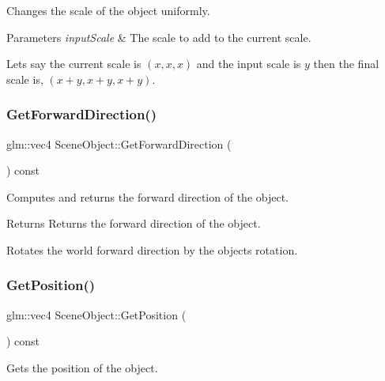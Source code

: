 Changes the scale of the object uniformly. 


\begin{DoxyParams}{Parameters}
{\em input\+Scale} & The scale to add to the current scale.\\
\hline
\end{DoxyParams}
Let\textquotesingle{}s say the current scale is $(x, x, x)$ and the input scale is $y$ then the final scale is, $(x + y, x + y, x + y)$. \hypertarget{class_scene_object_a17a33730106caaeeaede13682440eadc}{}\label{class_scene_object_a17a33730106caaeeaede13682440eadc} 
\subsubsection{\texorpdfstring{Get\+Forward\+Direction()}{GetForwardDirection()}}
{\footnotesize\ttfamily glm\+::vec4 Scene\+Object\+::\+Get\+Forward\+Direction (\begin{DoxyParamCaption}{ }\end{DoxyParamCaption}) const\hspace{0.3cm}{\ttfamily [virtual]}}



Computes and returns the forward direction of the object. 

\begin{DoxyReturn}{Returns}
Returns the forward direction of the object.
\end{DoxyReturn}
Rotates the world forward direction by the object\textquotesingle{}s rotation. \hypertarget{class_scene_object_a599d20872bfe1f3de5a40dd4535047a5}{}\label{class_scene_object_a599d20872bfe1f3de5a40dd4535047a5} 
\subsubsection{\texorpdfstring{Get\+Position()}{GetPosition()}}
{\footnotesize\ttfamily glm\+::vec4 Scene\+Object\+::\+Get\+Position (\begin{DoxyParamCaption}{ }\end{DoxyParamCaption}) const\hspace{0.3cm}{\ttfamily [inline]}}



Gets the position of the object. 

